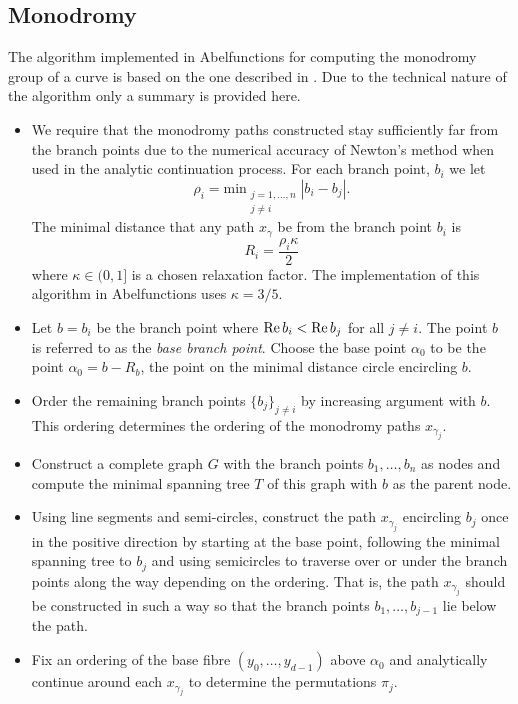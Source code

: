 \subsection{Monodromy}\label{subsec:abelfunctions-monodromy}


The algorithm implemented in Abelfunctions for computing the monodromy
group of a curve is based on the one described in \cite{FKS12}. Due to the
technical nature of the algorithm only a summary is provided here.

\begin{itemize}
\item We require that the monodromy paths constructed stay sufficiently far from
  the branch points due to the numerical accuracy of Newton's method when used
  in the analytic continuation process. For each branch point, $b_i$ we let
  \[
    \rho_i = \text{min}_{\substack{j=1,\ldots,n \\ j\neq i}} |b_i - b_j|.
  \]
  The minimal distance that any path $x_\gamma$ be from the branch point $b_i$
  is
  \[
    R_i = \frac{\rho_i \kappa}{2}
  \]
  where $\kappa \in (0,1]$ is a chosen relaxation factor. The implementation of
  this algorithm in Abelfunctions uses $\kappa = 3/5$.
\item Let $b = b_i$ be the branch point where $\operatorname{\text{Re}} b_i < \operatorname{\text{Re}} b_j$ for all $j
  \neq i$. The point $b$ is referred to as the {\it base branch point}. Choose
  the base point $\alpha_0$ to be the point $\alpha_0 = b - R_b$, the point on
  the minimal distance circle encircling $b$.
\item Order the remaining branch points $\{b_j\}_{j \neq i}$ by increasing
  argument with $b$. This ordering determines the ordering of the monodromy
  paths $x_{\gamma_j}$.
\item Construct a complete graph $G$ with the branch points $b_1,\ldots,b_n$ as
  nodes and compute the minimal spanning tree $T$ of this graph with $b$ as the
  parent node.
\item Using line segments and semi-circles, construct the path $x_{\gamma_j}$
  encircling $b_j$ once in the positive direction by starting at the base point,
  following the minimal spanning tree to $b_j$ and using semicircles to traverse
  over or under the branch points along the way depending on the ordering. That
  is, the path $x_{\gamma_j}$ should be constructed in such a way so that the
  branch points $b_1,\ldots,b_{j-1}$ lie below the path.
\item Fix an ordering of the base fibre $(y_0,\ldots,y_{d-1})$ above $\alpha_0$
  and analytically continue around each $x_{\gamma_j}$ to determine the
  permutations $\pi_j$.
\end{itemize}



